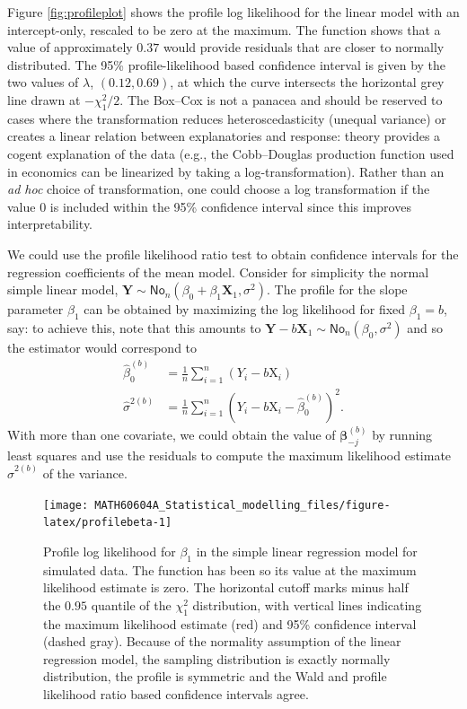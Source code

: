 \documentclass[
  11pt,
  letterpaper,
]{book}
\theoremstyle{definition}
\theoremstyle{definition}
\theoremstyle{definition}
\theoremstyle{definition}
\theoremstyle{remark}
\begin{document}
Figure \ref{fig:profileplot} shows the profile log likelihood for the linear model with an intercept-only, rescaled to be zero at the maximum. The function shows that a value of approximately \(0.37\) would provide residuals that are closer to normally distributed. The 95\% profile-likelihood based confidence interval is given by the two values of \(\lambda\), \((0.12, 0.69)\), at which the curve intersects the horizontal grey line drawn at \(-\chi^2_1/2\). The Box--Cox is not a panacea and should be reserved to cases where the transformation reduces heteroscedasticity (unequal variance) or creates a linear relation between explanatories and response: theory provides a cogent explanation of the data (e.g., the Cobb--Douglas production function used in economics can be linearized by taking a log-transformation). Rather than an \emph{ad hoc} choice of transformation, one could choose a log transformation if the value \(0\) is included within the 95\% confidence interval since this improves interpretability.

We could use the profile likelihood ratio test to obtain confidence intervals for the regression coefficients of the mean model. Consider for simplicity the normal simple linear model, \(\boldsymbol{Y} \sim \mathsf{No}_n(\beta_0 + \beta_1\mathbf{X}_1, \sigma^2)\). The profile for the slope parameter \(\beta_1\) can be obtained by maximizing the log likelihood for fixed \(\beta_1=b\), say: to achieve this, note that this amounts to \(\boldsymbol{Y}-b\mathbf{X}_1 \sim \mathsf{No}_n(\beta_0, \sigma^2)\) and so the estimator would correspond to
\begin{align*}
\widehat{\beta}_{0}^{(b)}&=\frac{1}{n} \sum_{i=1}^n (Y_i-b\mathrm{X}_i)\\
\widehat{\sigma}^{2(b)} &= \frac{1}{n}\sum_{i=1}^n \left(Y_i-b\mathrm{X}_i-\widehat{\beta}_{0}^{(b)}\right)^2.
\end{align*}
With more than one covariate, we could obtain the value of \(\boldsymbol{\beta}_{-j}^{(b)}\) by running least squares and use the residuals to compute the maximum likelihood estimate \(\widehat{\sigma}^{2(b)}\) of the variance.

\begin{figure}

{\centering \texttt{[image: MATH60604A\_Statistical\_modelling\_files/figure-latex/profilebeta-1]} 

}

\caption{Profile log likelihood for $\beta_1$ in the simple linear regression model for simulated data. The function has been so its value at the maximum likelihood estimate is zero. The horizontal cutoff marks minus half the $0.95$ quantile of the $\chi^2_1$ distribution, with vertical lines indicating the maximum likelihood estimate (red) and 95\% confidence interval (dashed gray). Because of the normality assumption of the linear regression model, the sampling distribution is exactly normally distribution, the profile is symmetric and the Wald and profile likelihood ratio based confidence intervals agree.}\label{fig:profilebeta}
\end{figure}
\end{document}
